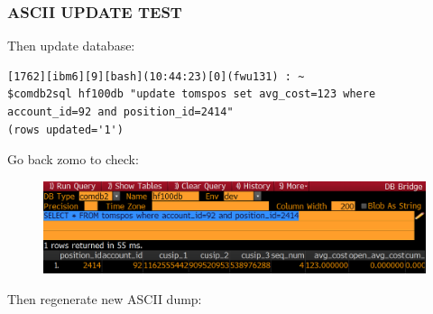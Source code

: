 \documentclass[8pt,]{article}
\begin{document}
\subsubsection{ASCII UPDATE TEST}\label{ascii-update-test}

Then update database:

\begin{verbatim}
[1762][ibm6][9][bash](10:44:23)[0](fwu131) : ~
$comdb2sql hf100db "update tomspos set avg_cost=123 where account_id=92 and position_id=2414"
(rows updated='1')
\end{verbatim}

Go back zomo to check:

\begin{figure}[htbp]
\centering
\includegraphics{logd_zomo3.png}
\caption{}
\end{figure}

Then regenerate new ASCII dump:
\end{document}
